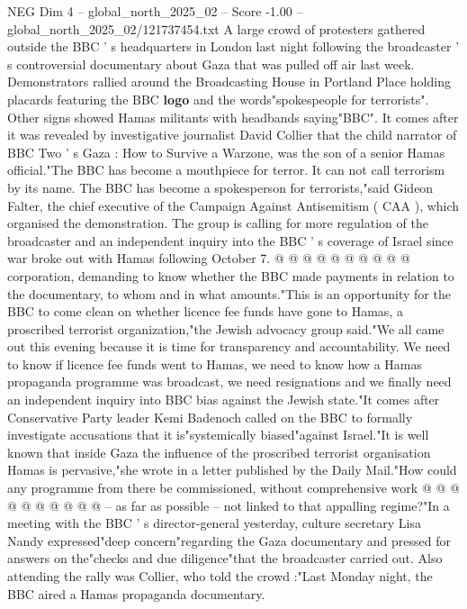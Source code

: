 \begin{textsample}{NEG Dim 4 – global\_north\_2025\_02 – Score -1.00 – global\_north\_2025\_02/121737454.txt}  \label{ex:f4_neg_401}
A large crowd of protesters gathered outside the BBC ' s headquarters in London last night following the broadcaster ' s controversial documentary about Gaza that was pulled off air last week.
Demonstrators rallied around the Broadcasting House in Portland Place holding placards featuring the BBC \textbf{logo} and the words"spokespeople for terrorists".
Other signs showed Hamas militants with headbands saying"BBC".
It comes after it was revealed by investigative journalist David Collier that the child narrator of BBC Two ' s Gaza : How to Survive a Warzone, was the son of a senior Hamas official."The BBC has become a mouthpiece for terror.
It can not call terrorism by its name.
The BBC has become a spokesperson for terrorists,"said Gideon Falter, the chief executive of the Campaign Against Antisemitism ( CAA ), which organised the demonstration.
The group is calling for more regulation of the broadcaster and an independent inquiry into the BBC ' s coverage of Israel since war broke out with Hamas following October 7. @ @ @ @ @ @ @ @ @ @ corporation, demanding to know whether the BBC made payments in relation to the documentary, to whom and in what amounts."This is an opportunity for the BBC to come clean on whether licence fee funds have gone to Hamas, a proscribed terrorist organization,"the Jewish advocacy group said."We all came out this evening because it is time for transparency and accountability.
We need to know if licence fee funds went to Hamas, we need to know how a Hamas propaganda programme was broadcast, we need resignations and we finally need an independent inquiry into BBC bias against the Jewish state."It comes after Conservative Party leader Kemi Badenoch called on the BBC to formally investigate accusations that it is"systemically biased"against Israel."It is well known that inside Gaza the influence of the proscribed terrorist organisation Hamas is pervasive,"she wrote in a letter published by the Daily Mail."How could any programme from there be commissioned, without comprehensive work @ @ @ @ @ @ @ @ @ @ -- as far as possible -- not linked to that appalling regime?"In a meeting with the BBC ' s director-general yesterday, culture secretary Lisa Nandy expressed"deep concern"regarding the Gaza documentary and pressed for answers on the"checks and due diligence"that the broadcaster carried out.
Also attending the rally was Collier, who told the crowd :"Last Monday night, the BBC aired a Hamas propaganda documentary.

\end{textsample}
